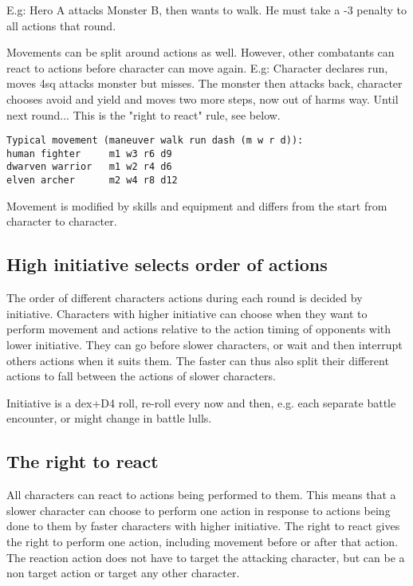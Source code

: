 E.g: Hero A attacks Monster B, then wants to walk. He must take a -3 penalty to all actions that round.

Movements can be split around actions as well. However, other combatants can react to actions before character can move again. E.g: Character declares run, moves 4sq attacks monster but misses. The monster then attacks back, character chooses avoid and yield and moves two more steps, now out of harms way. Until next round... This is the "right to react" rule, see below.

\begin{verbatim}
Typical movement (maneuver walk run dash (m w r d)):
human fighter     m1 w3 r6 d9
dwarven warrior   m1 w2 r4 d6
elven archer      m2 w4 r8 d12
\end{verbatim}

Movement is modified by skills and equipment and differs from the start from character to character.


\subsection*{High initiative selects order of actions}
The order of different characters actions during each round is decided by initiative. Characters with higher initiative can choose when they want to perform movement and actions relative to the action timing of opponents with lower initiative. They can go before slower characters, or wait and then interrupt others actions when it suits them. The faster can thus also split their different actions to fall between the actions of slower characters.

Initiative is a dex+D4 roll, re-roll every now and then, e.g. each separate battle encounter, or might change in battle lulls.


\subsection*{The right to react}
All characters can react to actions being performed to them. This means that a slower character can choose to perform one action in response to actions being done to them by faster characters with higher initiative.
The right to react gives the right to perform one action, including movement before or after that action. The reaction action does not have to target the attacking character, but can be a non target action or target any other character.

